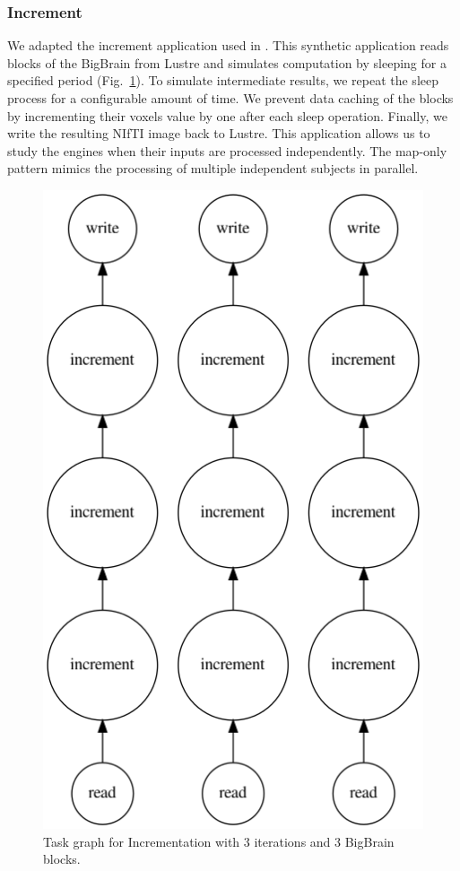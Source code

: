 \documentclass[conference]{IEEEtran}
\begin{document}
\subsubsection{Increment}
We adapted the increment application used in \cite{hayot2019performance}.
This synthetic application reads blocks of the BigBrain from Lustre and
simulates computation by sleeping for a specified period (Fig.~\ref{fig:graph-increment}). To simulate
intermediate results, we repeat the sleep process for a configurable amount
of time. We prevent data caching of the blocks by incrementing their voxels
value by one after each sleep operation. Finally, we write the resulting
NIfTI image back to Lustre. This application allows us to study the engines
when their inputs are processed independently. The map-only pattern
mimics the processing of multiple independent subjects in parallel.
\begin{figure}[!ht]
	\centering
	\includegraphics[height=\columnwidth,
	angle=0]{figures/increment.png}
	\caption{Task graph for Incrementation with 3 iterations and 3 BigBrain blocks.}
	\label{fig:graph-increment}
\end{figure}
			
\end{document}

